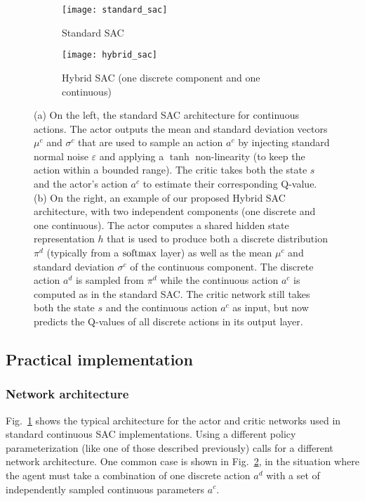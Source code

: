 \documentclass[letterpaper]{article} \usepackage{aaai20}  \usepackage{times}  \usepackage{helvet} \usepackage{courier}  \usepackage[hyphens]{url}  \usepackage{graphicx} \urlstyle{rm} \def\UrlFont{\rm}  \usepackage{graphicx}  \usepackage[section]{placeins}
\begin{document}
\begin{figure*}[htbp]
 
\begin{subfigure}{0.48\textwidth}
\texttt{[image: standard\_sac]}
\caption{Standard SAC}
\label{fig:sac_standard}
\end{subfigure}
\hfill
\begin{subfigure}{0.48\textwidth}
\texttt{[image: hybrid\_sac]}
\caption{Hybrid SAC (one discrete component and one continuous)}
\label{fig:sac_hybrid}
\end{subfigure}
 
\caption{(a) On the left, the standard SAC architecture for continuous actions. The actor outputs the mean and standard deviation vectors $\mu^c$ and $\sigma^c$ that are used to sample an action $a^c$ by injecting standard normal noise $\varepsilon$ and applying a $\tanh$ non-linearity (to keep the action within a bounded range).
The critic takes both the state $s$ and the actor's action $a^c$ to estimate their corresponding Q-value.
(b) On the right, an example of our proposed Hybrid SAC architecture, with two independent components (one discrete and one continuous).
The actor computes a shared hidden state representation $h$ that is used to produce both a discrete distribution $\pi^d$ (typically from a $\operatorname*{softmax}$ layer) as well as the mean $\mu^c$ and standard deviation $\sigma^c$ of the continuous component.
The discrete action $a^d$ is sampled from $\pi^d$ while the continuous action $a^c$ is computed as in the standard SAC.
The critic network still takes both the state $s$ and the continuous action $a^c$ as input, but now predicts the Q-values of all discrete actions in its output layer.
}
\label{fig:sac}
\end{figure*}
 
\subsection{Practical implementation}
 
\subsubsection{Network architecture}
 
Fig.~\ref{fig:sac_standard} shows the typical architecture for the actor and critic networks used in standard continuous SAC implementations.
Using a different policy parameterization (like one of those described previously) calls for a different network architecture.
One common case is shown in Fig.~\ref{fig:sac_hybrid}, in the situation where the agent must take a combination of one discrete action $a^d$ with a set of independently sampled continuous parameters $a^c$.
\end{document}
